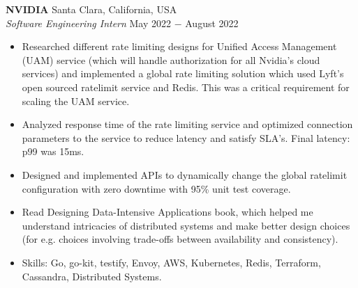 \documentclass{article}
\begin{document}
\noindent \textbf{NVIDIA} \hfill Santa Clara, California, USA\\
\textit{Software Engineering Intern} \hfill May 2022 $-$ August 2022
\begin{itemize}[noitemsep,nolistsep,leftmargin=*]
	\item Researched different rate limiting designs for Unified Access Management (UAM) service (which will handle authorization for all Nvidia's cloud services) and implemented a global rate limiting solution which used Lyft's open sourced ratelimit service and Redis. This was a critical requirement for scaling the UAM service. 
	\item Analyzed response time of the rate limiting service and optimized connection parameters to the service to reduce latency and satisfy SLA's. Final latency: p99 was 15ms.
	\item Designed and implemented APIs to dynamically change the global ratelimit configuration with zero downtime with 95\% unit test coverage.
	\item Read Designing Data-Intensive Applications book, which helped me understand intricacies of distributed systems and make better design choices (for e.g. choices involving trade-offs between availability and consistency).
	\item Skills: Go, go-kit, testify, Envoy, AWS, Kubernetes, Redis, Terraform, Cassandra, Distributed Systems. \\
\end{itemize}
\end{document}
